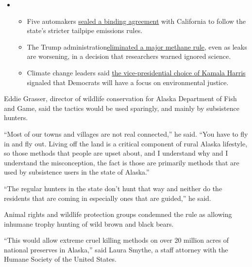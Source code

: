 \begin{itemize}
\item
  \begin{itemize}
  \tightlist
  \item
    Five automakers
    \href{https://www.nytimes3xbfgragh.onion/2020/08/17/climate/california-automakers-pollution.html?action=click\&pgtype=Article\&state=default\&region=MAIN_CONTENT_1\&context=storylines_keepup}{sealed
    a binding agreement} with California to follow the state's stricter
    tailpipe emissions rules.
  \item
    The Trump
    administration\href{https://www.nytimes3xbfgragh.onion/2020/08/13/climate/trump-methane.html?action=click\&pgtype=Article\&state=default\&region=MAIN_CONTENT_1\&context=storylines_keepup}{eliminated
    a major methane rule}, even as leaks are worsening, in a decision
    that researchers warned ignored science.
  \item
    Climate change leaders said
    \href{https://www.nytimes3xbfgragh.onion/2020/08/12/climate/kamala-harris-environmental-justice.html?action=click\&pgtype=Article\&state=default\&region=MAIN_CONTENT_1\&context=storylines_keepup}{the
    vice-presidential choice of Kamala Harris} signaled that Democrats
    will have a focus on environmental justice.
  \end{itemize}
\end{itemize}

Eddie Grasser, director of wildlife conservation for Alaska Department
of Fish and Game, said the tactics would be used sparingly, and mainly
by subsistence hunters.

``Most of our towns and villages are not real connected,'' he said.
``You have to fly in and fly out. Living off the land is a critical
component of rural Alaska lifestyle, so those methods that people are
upset about, and I understand why and I understand the misconception,
the fact is those are primarily methods that are used by subsistence
users in the state of Alaska.''

``The regular hunters in the state don't hunt that way and neither do
the residents that are coming in especially ones that are guided,'' he
said.

Animal rights and wildlife protection groups condemned the rule as
allowing inhumane trophy hunting of wild brown and black bears.

``This would allow extreme cruel killing methods on over 20 million
acres of national preserves in Alaska,'' said Laura Smythe, a staff
attorney with the Humane Society of the United States.

